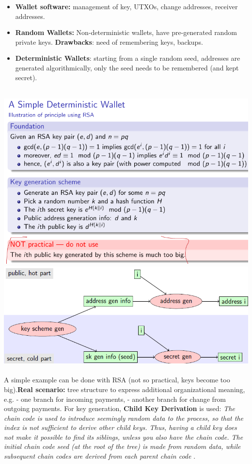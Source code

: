 \documentclass{article}
\begin{document}
\begin{itemize}
\item \textbf{Wallet software:} management of key, UTXOs, change addresses, receiver addresses.
\item \textbf{Random Wallets: }Non-deterministic wallets, have pre-generated random private keys. \textbf{Drawbacks}: need of remembering keys, backups.
\item \textbf{Deterministic Wallets}: starting from a single random seed, addresses are generated algorithmically, only the seed needs to be remembered (and kept secret).\\\\
\end{itemize}
\includegraphics[scale=0.3]{71.png}
\includegraphics[scale=0.5]{37.png}\\\\
A simple example can be done with RSA (not so practical, keys become too big).\textbf{Real scenario: } tree structure to express additional organizational meaning, e.g. - one branch for incoming payments, - another branch for change from outgoing payments. For key generation, \textbf{Child Key Derivation} is used: \textit{The chain code is used to introduce seemingly random data to the process, so that the index is not sufficient to derive other child keys. Thus, having a child key does not make it possible to find its siblings, unless you also have the chain code. The initial chain code seed (at the root of the tree) is made from random data, while subsequent chain codes are derived from each parent chain code} .
\end{document}
